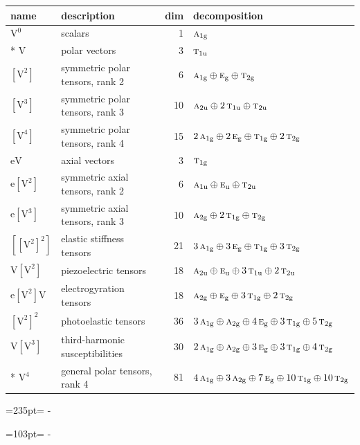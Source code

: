 \documentclass[10pt,a4paper]{article}
\newcommand{\needspace}[1]{\par\penalty-100\begingroup\dimen0=#1\relax\dimen2=\pagegoal
  \advance\dimen2-\pagetotal\ifdim\dimen0>\dimen2\relax\ifdim\dimen2>0pt\vfil\break\fi\fi
  \endgroup}
\numberwithin{equation}{section}
\newcommand{\irr}[1]{\text{\normalfont\scshape #1}}
\newcommand{\ptag}[1]{\mathrm{#1}}
\newcommand{\jahn}[1]{\mathrm{#1}}
\newlength{\fillwidth}\newlength{\cellwidth}\newlength{\colwidth}
\begin{document}
{\begin{longtable}{@{}llr>{\RaggedRight\arraybackslash}p{\fillwidth}@{}}
name & description & dim & decomposition\\\midrule\endhead
\bottomrule\endfoot\endlastfoot
$\jahn{V^{0}}$ & scalars & 1 & $\irr{a}_{1\ptag{g}}$\\*
$\jahn{V}$ & polar vectors & 3 & $\irr{t}_{1\ptag{u}}$\\
$\jahn{[V^{2}]}$ & symmetric polar tensors, rank 2 & 6 & $\irr{a}_{1\ptag{g}} \oplus\allowbreak \irr{e}_{\ptag{g}} \oplus\allowbreak \irr{t}_{2\ptag{g}}$\\
$\jahn{[V^{3}]}$ & symmetric polar tensors, rank 3 & 10 & $\irr{a}_{2\ptag{u}} \oplus\allowbreak 2\,\irr{t}_{1\ptag{u}} \oplus\allowbreak \irr{t}_{2\ptag{u}}$\\
$\jahn{[V^{4}]}$ & symmetric polar tensors, rank 4 & 15 & $2\,\irr{a}_{1\ptag{g}} \oplus\allowbreak 2\,\irr{e}_{\ptag{g}} \oplus\allowbreak \irr{t}_{1\ptag{g}} \oplus\allowbreak 2\,\irr{t}_{2\ptag{g}}$\\
$\jahn{eV}$ & axial vectors & 3 & $\irr{t}_{1\ptag{g}}$\\
$\jahn{e[V^{2}]}$ & symmetric axial tensors, rank 2 & 6 & $\irr{a}_{1\ptag{u}} \oplus\allowbreak \irr{e}_{\ptag{u}} \oplus\allowbreak \irr{t}_{2\ptag{u}}$\\
$\jahn{e[V^{3}]}$ & symmetric axial tensors, rank 3 & 10 & $\irr{a}_{2\ptag{g}} \oplus\allowbreak 2\,\irr{t}_{1\ptag{g}} \oplus\allowbreak \irr{t}_{2\ptag{g}}$\\
$\jahn{[[V^{2}]^{2}]}$ & elastic stiffness tensors & 21 & $3\,\irr{a}_{1\ptag{g}} \oplus\allowbreak 3\,\irr{e}_{\ptag{g}} \oplus\allowbreak \irr{t}_{1\ptag{g}} \oplus\allowbreak 3\,\irr{t}_{2\ptag{g}}$\\
$\jahn{V[V^{2}]}$ & piezoelectric tensors & 18 & $\irr{a}_{2\ptag{u}} \oplus\allowbreak \irr{e}_{\ptag{u}} \oplus\allowbreak 3\,\irr{t}_{1\ptag{u}} \oplus\allowbreak 2\,\irr{t}_{2\ptag{u}}$\\
$\jahn{e[V^{2}]V}$ & electrogyration tensors & 18 & $\irr{a}_{2\ptag{g}} \oplus\allowbreak \irr{e}_{\ptag{g}} \oplus\allowbreak 3\,\irr{t}_{1\ptag{g}} \oplus\allowbreak 2\,\irr{t}_{2\ptag{g}}$\\
$\jahn{[V^{2}]^{2}}$ & photoelastic tensors & 36 & $3\,\irr{a}_{1\ptag{g}} \oplus\allowbreak \irr{a}_{2\ptag{g}} \oplus\allowbreak 4\,\irr{e}_{\ptag{g}} \oplus\allowbreak 3\,\irr{t}_{1\ptag{g}} \oplus\allowbreak 5\,\irr{t}_{2\ptag{g}}$\\
$\jahn{V[V^{3}]}$ & third-harmonic susceptibilities & 30 & $2\,\irr{a}_{1\ptag{g}} \oplus\allowbreak \irr{a}_{2\ptag{g}} \oplus\allowbreak 3\,\irr{e}_{\ptag{g}} \oplus\allowbreak 3\,\irr{t}_{1\ptag{g}} \oplus\allowbreak 4\,\irr{t}_{2\ptag{g}}$\\*
$\jahn{V^{4}}$ & general polar tensors, rank 4 & 81 & $4\,\irr{a}_{1\ptag{g}} \oplus\allowbreak 3\,\irr{a}_{2\ptag{g}} \oplus\allowbreak 7\,\irr{e}_{\ptag{g}} \oplus\allowbreak 10\,\irr{t}_{1\ptag{g}} \oplus\allowbreak 10\,\irr{t}_{2\ptag{g}}$\\
\bottomrule\end{longtable}}
\needspace{235pt}
\needspace{103pt}
\end{document}

